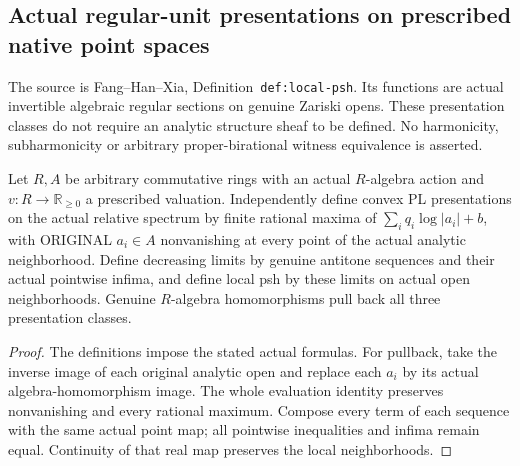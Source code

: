 \subsection{Actual regular-unit presentations on prescribed native point spaces}
The source is Fang--Han--Xia,
Definition~\texttt{def:local-psh}. Its functions are actual invertible algebraic
regular sections on genuine Zariski opens. These presentation classes do not
require an analytic structure sheaf to be defined. No harmonicity,
subharmonicity or arbitrary proper-birational witness equivalence is asserted.

\begin{definition}
\label{scheme:finite-coefficient-local-psh}
\leanok
Let $R,A$ be arbitrary commutative rings with an actual $R$-algebra action and
$v:R\to\mathbb R_{\ge0}$ a prescribed valuation. Independently define convex
PL presentations on the actual relative spectrum by finite rational maxima of
$\sum_i q_i\log|a_i|+b$, with ORIGINAL $a_i\in A$ nonvanishing at every point
of the actual analytic neighborhood. Define decreasing limits by genuine
antitone sequences and their actual pointwise infima, and define local psh by
these limits on actual open neighborhoods. Genuine $R$-algebra homomorphisms
pull back all three presentation classes.
\end{definition}
\begin{proof}
The definitions impose the stated actual formulas. For pullback, take the
inverse image of each original analytic open and replace each $a_i$ by its
actual algebra-homomorphism image. The whole evaluation identity preserves
nonvanishing and every rational maximum. Compose every term of each sequence
with the same actual point map; all pointwise inequalities and infima remain
equal. Continuity of that real map preserves the local neighborhoods.
\end{proof}

